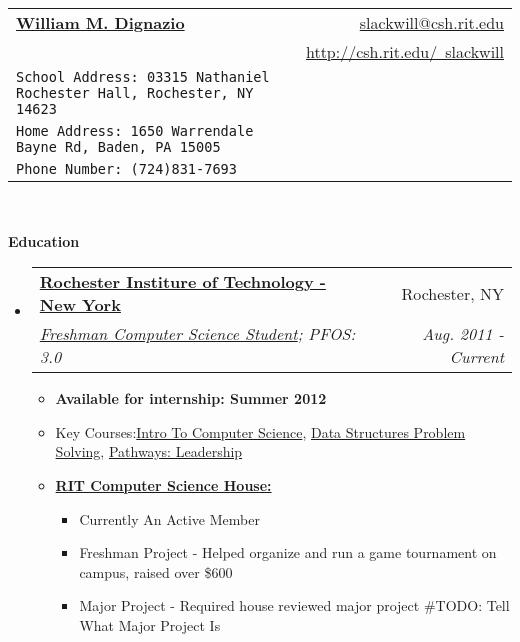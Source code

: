 \documentclass[letterpaper,11pt]{article}
\makeatletter
\newcommand{\resitem}[1]{\item #1 \vspace{-2pt}}
\newcommand{\resheading}[1]{{\large \colorbox{mygrey}{\begin{minipage}{\textwidth}{\textbf{#1 \vphantom{p\^{E}}}}\end{minipage}}}}
\newcommand{\ressubheading}[4]{
\begin{tabular*}{6.5in}{l@{\extracolsep{\fill}}r}
		\textbf{#1} & #2 \\
		\textit{#3} & \textit{#4} \\
\end{tabular*}\vspace{-6pt}}
\makeatother
\begin{document}
\newcommand{\mywebheader}{
\begin{tabular*}{7in}{l@{\extracolsep{\fill}}r}
	\textbf{\href{http://csh.rit.edu/~slackwill}{\Huge William M. Dignazio}} & \href{mailto:slackwill@csh.rit.edu}{slackwill@csh.rit.edu}\\ &
	\href{http://csh.rit.edu/~slackwill}{http://csh.rit.edu/~slackwill} \\
	{\footnotesize \texttt{{School Address: 03315 Nathaniel Rochester Hall,
Rochester, NY 14623}}} & \\
	{\footnotesize \texttt{{Home Address: 1650 Warrendale Bayne Rd, Baden, PA 15005}}} & \\
	{\footnotesize \texttt{{Phone Number: (724)831-7693}}} & 

	\end{tabular*}
\\
\vspace{0.1in}}

\mywebheader

\resheading{Education}
	\begin{itemize}
		\item
			\ressubheading{\href{http://www.rit.edu}{Rochester Institure of Technology - New York}}{Rochester, NY}{\href{http://www.cs.rit.edu/}{Freshman Computer Science Student}; {PFOS: 3.0}}{Aug. 2011 - Current}
				{ \footnotesize
				\begin{itemize}
					\resitem{\textbf{Available for internship: Summer 2012}}
					\resitem{Key Courses:\href{https://register.rit.edu/courseSchedule/20111/40/03/241/05}{Intro To Computer Science}, \href{https://register.rit.edu/courseSchedule/20112/40/03/242/05}{Data Structures Problem Solving}, \href{https://register.rit.edu/courseSchedule/20112/17/20/053/03}{Pathways: Leadership}}
					\resitem{\textbf{\href{http://csh.rit.edu/}{RIT Computer Science House:}}} 
						\begin{itemize}
							\resitem{{Currently An Active Member}}						
							\resitem{{Freshman Project} - Helped organize and run a game tournament on campus, raised over \$600} 
							\resitem{{Major Project} - Required house reviewed major project #TODO: Tell What Major Project Is}
						\end{itemize}
				\end{itemize}
				}
	\end{itemize} %
\end{document}
